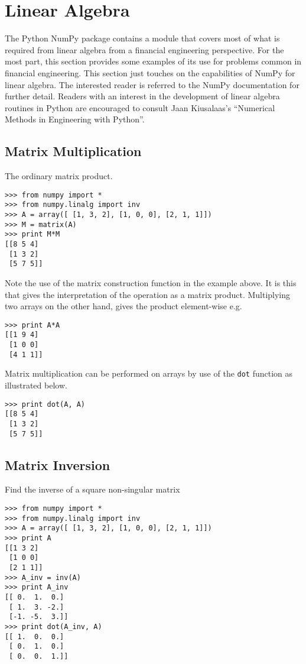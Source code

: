 \section{Linear Algebra}

The Python NumPy package contains a module that covers most of what is
required from linear algebra from a financial engineering
perspective. For the most part, this section provides some examples of
its use for problems common in financial engineering. This section
just touches on the capabilities of NumPy for linear algebra. The
interested reader is referred to the NumPy documentation for further
detail. Readers with an interest in the development of linear algebra
routines in Python are encouraged to consult Jaan Kiusalaas's
``Numerical Methods in Engineering with Python''\cite{book:KIUSALAAS}.

\subsection{Matrix Multiplication}
The ordinary matrix product.
\begin{verbatim}
>>> from numpy import *
>>> from numpy.linalg import inv
>>> A = array([ [1, 3, 2], [1, 0, 0], [2, 1, 1]]) 
>>> M = matrix(A)
>>> print M*M
[[8 5 4]
 [1 3 2]
 [5 7 5]]
\end{verbatim}
Note the use of the matrix construction function in the example
above. It is this that gives the interpretation of the operation as a
matrix product. Multiplying two arrays on the other hand, gives the
product element-wise e.g.
\begin{verbatim}
>>> print A*A
[[1 9 4]
 [1 0 0]
 [4 1 1]]
\end{verbatim}
Matrix multiplication can be performed on arrays by use of the
\verb|dot| function as illustrated below.
\begin{verbatim}
>>> print dot(A, A)
[[8 5 4]
 [1 3 2]
 [5 7 5]]
\end{verbatim}

\subsection{Matrix Inversion}
Find the inverse of a square non-singular matrix 
\begin{verbatim}
>>> from numpy import *
>>> from numpy.linalg import inv
>>> A = array([ [1, 3, 2], [1, 0, 0], [2, 1, 1]]) 
>>> print A
[[1 3 2]
 [1 0 0]
 [2 1 1]]
>>> A_inv = inv(A)
>>> print A_inv
[[ 0.  1.  0.]
 [ 1.  3. -2.]
 [-1. -5.  3.]]
>>> print dot(A_inv, A)
[[ 1.  0.  0.]
 [ 0.  1.  0.]
 [ 0.  0.  1.]]
\end{verbatim}

